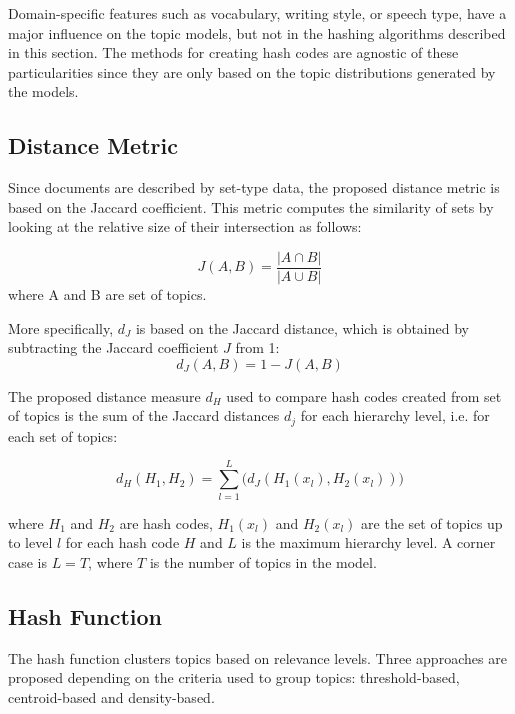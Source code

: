 Domain-specific features such as vocabulary, writing style, or speech type, have a major influence on the topic models, but not in the hashing algorithms described in this section. The methods for creating hash codes are agnostic of these particularities since they are only based on the topic distributions generated by the models. 

\subsection{Distance Metric}
\label{sec:large-distance-metric}
Since documents are described by set-type data, the proposed distance metric is based on the Jaccard coefficient. This metric computes the similarity of sets by looking at the relative size of their intersection as follows:

\begin{equation}
J(A,B) = \frac{ | A \cap B |}{ | A \cup B |}
\label{eq:jc}
\end{equation}
where A and B are set of topics. 

More specifically, $d_J$ is based on the Jaccard distance, which is obtained by subtracting the Jaccard coefficient $J$ from 1:
\begin{equation}
d_J(A,B) = 1 - J(A,B)
\label{eq:dj}
\end{equation}

The proposed distance measure $d_H$ used to compare hash codes created from set of topics is the sum of the Jaccard distances $d_j$ for each hierarchy level, i.e. for each set of topics:

\begin{equation}
d_H(H_1,H_2) = \sum\limits_{l=1}^L \Big( d_J(H_1(x_l),H_2(x_l)) \Big)
\label{eq:dh}
\end{equation}

where $H_1$ and $H_2$ are hash codes, $H_1(x_l)$ and $H_2(x_l)$ are the set of topics up to level $l$ for each hash code $H$ and $L$ is the maximum hierarchy level. A corner case is $L=T$, where $T$ is the number of topics in the model. 


\subsection{Hash Function}
\label{sec:comparison-hash}

The hash function clusters topics based on relevance levels. Three approaches are proposed depending on the criteria used to group topics: threshold-based, centroid-based and density-based.

